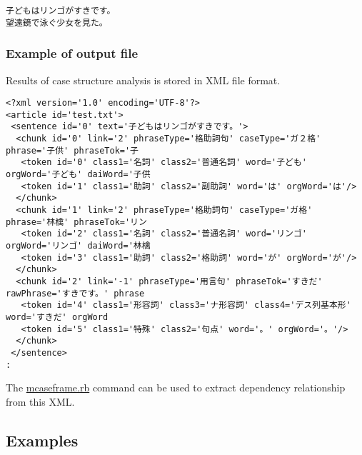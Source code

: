 \begin{Verbatim}[baselinestretch=0.7,frame=single]
子どもはリンゴがすきです。
望遠鏡で泳ぐ少女を見た。
\end{Verbatim}


\subsubsection*{Example of output file} 

Results of case structure analysis is stored in XML file format. 

\begin{Verbatim}[baselinestretch=0.7,frame=single]
<?xml version='1.0' encoding='UTF-8'?>
<article id='test.txt'>
 <sentence id='0' text='子どもはリンゴがすきです。'>
  <chunk id='0' link='2' phraseType='格助詞句' caseType='ガ２格' phrase='子供' phraseTok='子
   <token id='0' class1='名詞' class2='普通名詞' word='子ども' orgWord='子ども' daiWord='子供
   <token id='1' class1='助詞' class2='副助詞' word='は' orgWord='は'/>
  </chunk>
  <chunk id='1' link='2' phraseType='格助詞句' caseType='ガ格' phrase='林檎' phraseTok='リン
   <token id='2' class1='名詞' class2='普通名詞' word='リンゴ' orgWord='リンゴ' daiWord='林檎
   <token id='3' class1='助詞' class2='格助詞' word='が' orgWord='が'/>
  </chunk>
  <chunk id='2' link='-1' phraseType='用言句' phraseTok='すきだ' rawPhrase='すきです。' phrase
   <token id='4' class1='形容詞' class3='ナ形容詞' class4='デス列基本形' word='すきだ' orgWord
   <token id='5' class1='特殊' class2='句点' word='。' orgWord='。'/>
  </chunk>
 </sentence>
:
\end{Verbatim}

The \hyperref[sect:mcaseframe]{mcaseframe.rb} command can be used to extract dependency relationship from this XML.  


\subsection{Examples}


%

